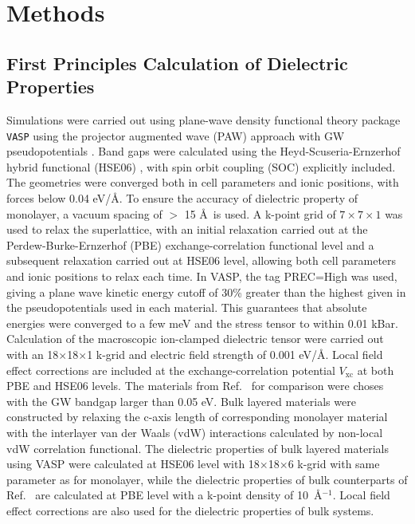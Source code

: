 \section{Methods}
\label{sec:diel-org8457dbb}

\subsection*{First Principles Calculation of Dielectric Properties}
\label{sec:first-princ-calc}

Simulations were carried out using plane-wave density functional
theory package \texttt{VASP}
\autocite{Kresse_1993_MD_liquid_metal,Kresse_1996_1,Kresse_1996_2} using
the projector augmented wave (PAW) approach with GW pseudopotentials
\autocite{Kresse_1999_pseudopotentials}. Band gaps were calculated using
the Heyd-Scuseria-Ernzerhof hybrid functional (HSE06)
\autocite{Heyd_2003_HSe,HSE_2006_erratum}, with spin orbit coupling (SOC) explicitly
included. The geometries were converged both in cell parameters and
ionic positions, with forces below 0.04 eV/\AA. To ensure the accuracy
of dielectric property of monolayer, a vacuum spacing of $>$ 15 \AA~is
used. A k-point grid of \(7\times7\times1\) was used to relax the
superlattice, with an initial relaxation carried out at the
Perdew-Burke-Ernzerhof
(PBE)\autocite{Perdew_1996_GGA,Ernzerhof_1999,Paier_2005_PBE}
exchange-correlation functional level and a subsequent relaxation
carried out at HSE06 level, allowing both cell parameters and ionic
positions to relax each time. In VASP, the tag PREC=High was used,
giving a plane wave kinetic energy cutoff of 30\% greater than the
highest given in the pseudopotentials used in each material. This
guarantees that absolute energies were converged to a few meV and the
stress tensor to within 0.01 kBar.  Calculation of the macroscopic
ion-clamped dielectric tensor were carried out with an
18$\times$18$\times$1 k-grid and electric field strength of 0.001
eV/\AA.  Local field effect corrections are included at the
exchange-correlation potential $V_{\mathrm{xc}}$ at both PBE and HSE06
levels. The materials from Ref.~\cite{Haastrup_2018_database} for comparison
were choses with the GW bandgap larger than 0.05 eV. Bulk layered
materials were constructed by relaxing the c-axis length of
corresponding monolayer material with the interlayer van der Waals
(vdW) interactions calculated by non-local vdW correlation
functional\autocite{Lee_2010_vdFD2}.  The dielectric properties of bulk
layered materials using VASP were calculated at HSE06 level with
18$\times$18$\times$6 k-grid with same parameter as for monolayer,
while the dielectric properties of bulk counterparts of
Ref.~\cite{Haastrup_2018_database} are calculated at PBE level with a k-point
density of 10~\AA$^{-1}$. Local field effect corrections are also used
for the dielectric properties of bulk systems.



